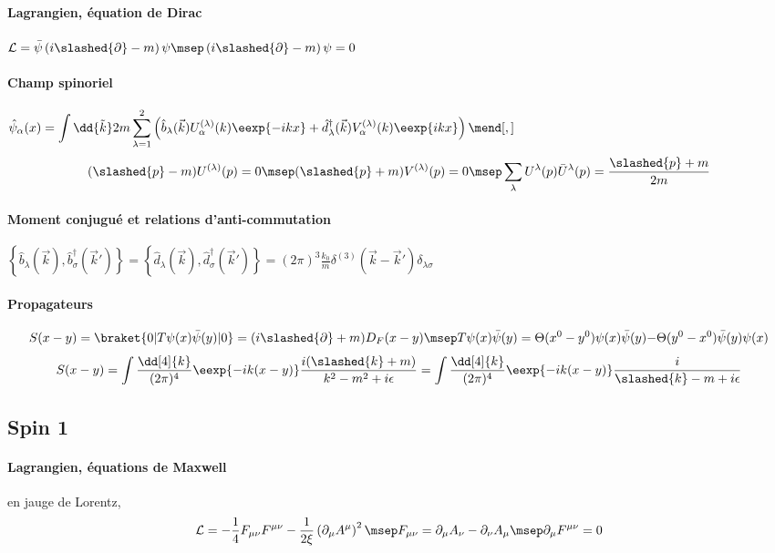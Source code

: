 \documentclass{article}
\begin{document}
\paragraph{Lagrangien, équation de Dirac}$\displaystyle
\mathcal{L} = \bar{\psi}\left(i\slashed{\partial}-m\right)\psi
\msep
\left(i\slashed{\partial}-m\right)\psi=0$
\paragraph{Champ spinoriel}$\displaystyle
\hat{\psi}_\alpha(x) = \int\dd{\tilde{k}} 2m \sum_{\lambda=1}^2 \left( \hat{b}_\lambda(\vec{k})U_\alpha^{(\lambda)}(k)\eexp{-ikx} + \hat{d}^\dagger_\lambda(\vec{k})V_\alpha^{(\lambda)}(k)\eexp{ikx} \right)
\mend[,]$
\begin{gather*}
(\slashed{p}-m)U^{(\lambda)}(p)=0
\msep
(\slashed{p}+m)V^{(\lambda)}(p)=0
\msep
\sum_\lambda U^\lambda(p)\bar{U}^\lambda(p)=\frac{\slashed{p}+m}{2m}
\end{gather*}
\paragraph{Moment conjugué et relations d'anti-commutation}$\displaystyle
\left\lbrace \hat{b}_\lambda(\vec{k}), \hat{b}^\dagger_\sigma(\vec{k}') \right\rbrace =
\left\lbrace \hat{d}_\lambda(\vec{k}), \hat{d}^\dagger_\sigma(\vec{k}') \right\rbrace =
(2\pi)^3 \frac{k_0}{m} \delta^{(3)}(\vec{k}-\vec{k}') \delta_{\lambda\sigma}$
\paragraph{Propagateurs}
\begin{align*}
S(x-y) = \braket{0|T\psi(x)\bar{\psi}(y)|0} = (i\slashed{\partial}+m)D_F(x-y)
\msep
T\psi(x)\bar{\psi}(y) = \Theta(x^0-y^0)\psi(x)\bar{\psi}(y) {-} \Theta(y^0-x^0)\bar{\psi}(y)\psi(x)
\end{align*}
\begin{align*}
S(x-y) = \int\frac{\dd[4]{k}}{(2\pi)^4}\eexp{-ik(x-y)} \frac{i(\slashed{k}+m)}{k^2-m^2+i\epsilon}
 = \int\frac{\dd[4]{k}}{(2\pi)^4}\eexp{-ik(x-y)} \frac{i}{\slashed{k}-m+i\epsilon}
\end{align*}

\subsection{Spin 1}
\paragraph{Lagrangien, équations \og de Maxwell \fg} en jauge de Lorentz,
\begin{align*}
\mathcal{L}= -\frac{1}{4}F_{\mu\nu}F^{\mu\nu} - \frac{1}{2\xi}\left(\partial_\mu A^\mu\right)^2
\msep
F_{\mu\nu} = \partial_\mu A_\nu-\partial_\nu A_\mu
\msep
\partial_\mu F^{\mu\nu} = 0
\end{align*}
\end{document}
